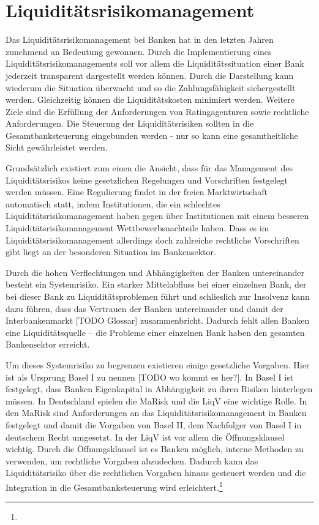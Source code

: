\newpage

\section{Liquiditätsrisikomanagement}
Das Liquiditätsrisikomanagement bei Banken hat in den letzten Jahren zunehmend an Bedeutung gewonnen. Durch die Implementierung eines Liquiditätsrisikomanagements  soll vor allem die Liquiditätssituation einer Bank jederzeit transparent dargestellt werden können. Durch die Darstellung kann wiederum die Situation überwacht und so die Zahlungsfähigkeit sichergestellt werden. Gleichzeitig können die Liquiditätskosten minimiert werden. Weitere Ziele sind die Erfüllung der Anforderungen von Ratingagenturen sowie rechtliche Anforderungen. Die Steuerung der Liquiditätsrisiken sollten in die Gesamtbanksteuerung eingebunden werden - nur so kann eine gesamtheitliche Sicht gewährleistet werden.

Grundsätzlich existiert zum einen die Ansicht, dass für das Management des Liquiditätsrisikos keine gesetzlichen Regelungen und Vorschriften festgelegt werden müssen. Eine Regulierung findet in der freien Marktwirtschaft automatisch statt, indem Institutionen, die ein schlechtes Liquiditätsrisikomanagement haben gegen über Institutionen mit einem besseren Liquiditätsrisikomanagement Wettbewerbsnachteile haben. Dass es im Liquiditätsrisikomanagement allerdings doch zahlreiche rechtliche Vorschriften gibt liegt an der besonderen Situation im Bankensektor. 

Durch die hohen Verflechtungen und Abhängigkeiten der Banken untereinander besteht ein Systemrisiko. Ein starker Mittelabfluss bei einer einzelnen Bank, der bei dieser Bank zu Liquiditätsproblemen führt und schlieslich zur Insolvenz kann dazu führen, dass das Vertrauen der Banken untereinander und damit der Interbankenmarkt [TODO Glossar] zusammenbricht. Dadurch fehlt allen Banken eine Liquiditätsquelle -- die Probleme einer einzelnen Bank haben den gesamten Bankensektor erreicht.

Um dieses Systemrisiko zu begrenzen existieren einige gesetzliche Vorgaben. Hier ist als Ursprung Basel I zu nennen [TODO wo kommt es her?]. In Basel I ist festgelegt, dass Banken Eigenkapital in Abhängigkeit zu ihren Risiken hinterlegen müssen.  In Deutschland spielen die \gls{MaRisk} und die \gls{LiqV} eine wichtige Rolle. In den \gls{MaRisk} sind Anforderungen an das Liquiditätsrisikomanagement in Banken festgelegt und damit die Vorgaben von Basel II, dem Nachfolger von Basel I in deutschem Recht umgesetzt. In der \gls{LiqV} ist vor allem die Öffnungsklausel wichtig. Durch die Öffnungsklausel ist es Banken möglich, interne Methoden zu verwenden, um rechtliche Vorgaben abzudecken. Dadurch kann das Liquiditätsrisiko über die rechtlichen Vorgaben hinaus gesteuert werden und die Integration in die Gesamtbanksteuerung wird erleichtert.\footnote{ }

